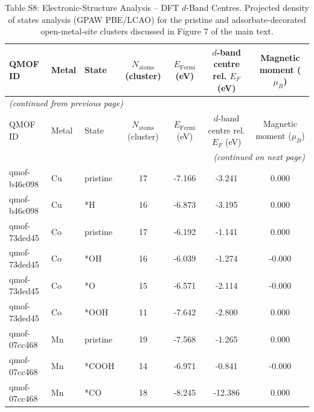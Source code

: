 {\scriptsize
\begin{longtable}{lllcccc}
\caption{Table S8: Electronic-Structure Analysis -- DFT $d$-Band Centres. Projected density of states analysis (GPAW PBE/LCAO) for the pristine and adsorbate-decorated open-metal-site clusters discussed in Figure 7 of the main text.} \label{tab:dband_centers} \\
\hline\hline
QMOF ID & Metal & State & $N_{\mathrm{atoms}}$ (cluster) & $E_{\mathrm{Fermi}}$ (eV) & $d$-band centre rel. $E_F$ (eV) & Magnetic moment ($\mu_B$) \\
\hline
\endfirsthead
\multicolumn{7}{l}{\textit{(continued from previous page)}} \\
\hline\hline
QMOF ID & Metal & State & $N_{\mathrm{atoms}}$ (cluster) & $E_{\mathrm{Fermi}}$ (eV) & $d$-band centre rel. $E_F$ (eV) & Magnetic moment ($\mu_B$) \\
\hline
\endhead
\hline
\multicolumn{7}{r}{\textit{(continued on next page)}} \\
\endfoot
\hline\hline
\endlastfoot
qmof-b46c098 & Cu & pristine & 17 & -7.166 & -3.241 & 0.000 \\
qmof-b46c098 & Cu & *H & 16 & -6.873 & -3.195 & 0.000 \\
qmof-73ded45 & Co & pristine & 17 & -6.192 & -1.141 & 0.000 \\
qmof-73ded45 & Co & *OH & 16 & -6.039 & -1.274 & -0.000 \\
qmof-73ded45 & Co & *O & 15 & -6.571 & -2.114 & -0.000 \\
qmof-73ded45 & Co & *OOH & 11 & -7.642 & -2.800 & 0.000 \\
qmof-07cc468 & Mn & pristine & 19 & -7.568 & -1.265 & 0.000 \\
qmof-07cc468 & Mn & *COOH & 14 & -6.971 & -0.841 & -0.000 \\
qmof-07cc468 & Mn & *CO & 18 & -8.245 & -12.386 & 0.000 \\
\end{longtable}
}
